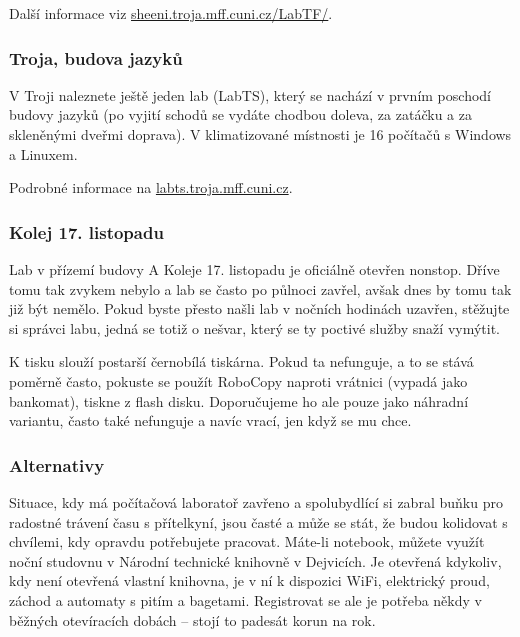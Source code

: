 Další informace viz \url{sheeni.troja.mff.cuni.cz/LabTF/}.


\subsubsection{Troja, budova jazyků}
V Troji naleznete ještě jeden lab (LabTS), který se nachází v prvním poschodí
budovy jazyků (po vyjití schodů se vydáte chodbou doleva, za zatáčku a za
skleněnými dveřmi doprava). V klimatizované místnosti je 16 počítačů s Windows a
Linuxem.

Podrobné informace na \url{labts.troja.mff.cuni.cz}.


\subsubsection{Kolej 17. listopadu}
Lab v přízemí budovy A Koleje 17. listopadu je oficiálně otevřen nonstop. Dříve
tomu tak zvykem nebylo a lab se často po půlnoci zavřel, avšak dnes by tomu tak
již být nemělo. Pokud byste přesto našli lab v nočních hodinách uzavřen,
stěžujte si správci labu, jedná se totiž o nešvar, který se ty poctivé služby
snaží vymýtit.

K tisku slouží postarší černobílá tiskárna. Pokud ta nefunguje, a to se stává
poměrně často, pokuste se použít RoboCopy naproti vrátnici (vypadá jako
bankomat), tiskne z flash disku. Doporučujeme ho ale pouze jako náhradní
variantu, často také nefunguje a navíc vrací, jen když se mu chce.


\subsubsection{Alternativy}
Situace, kdy má počítačová laboratoř zavřeno a spolubydlící si zabral buňku pro
radostné trávení času s přítelkyní, jsou časté a může se stát, že budou
kolidovat s chvílemi, kdy opravdu potřebujete pracovat. Máte-li notebook, můžete
využít noční studovnu v Národní technické knihovně v Dejvicích. Je otevřená
kdykoliv, kdy není otevřená vlastní knihovna, je v ní k dispozici WiFi,
elektrický proud, záchod a automaty s pitím a bagetami. Registrovat se ale je
potřeba někdy v běžných otevíracích dobách – stojí to padesát korun na rok.